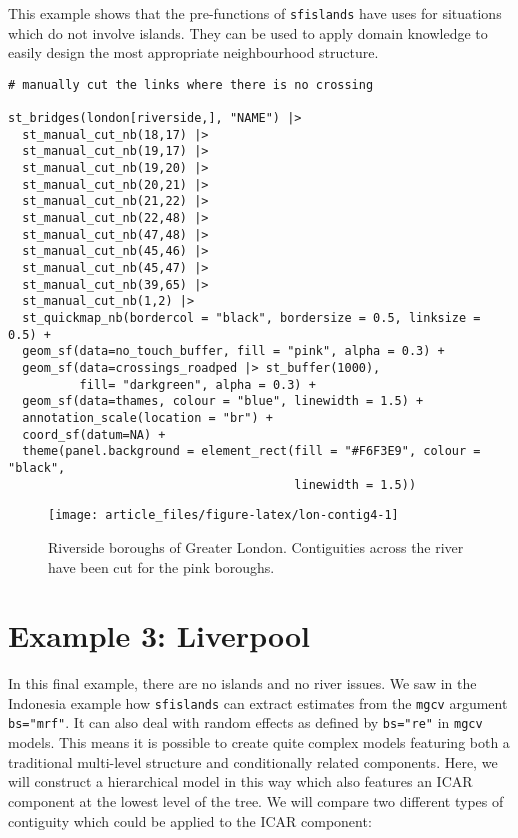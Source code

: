 This example shows that the pre-functions of \texttt{sfislands} have uses for situations which do not involve islands. They can be used to apply domain knowledge to easily design the most appropriate neighbourhood structure.

\begin{verbatim}
# manually cut the links where there is no crossing

st_bridges(london[riverside,], "NAME") |> 
  st_manual_cut_nb(18,17) |> 
  st_manual_cut_nb(19,17) |> 
  st_manual_cut_nb(19,20) |> 
  st_manual_cut_nb(20,21) |> 
  st_manual_cut_nb(21,22) |> 
  st_manual_cut_nb(22,48) |> 
  st_manual_cut_nb(47,48) |> 
  st_manual_cut_nb(45,46) |> 
  st_manual_cut_nb(45,47) |>  
  st_manual_cut_nb(39,65) |> 
  st_manual_cut_nb(1,2) |> 
  st_quickmap_nb(bordercol = "black", bordersize = 0.5, linksize = 0.5) +
  geom_sf(data=no_touch_buffer, fill = "pink", alpha = 0.3) + 
  geom_sf(data=crossings_roadped |> st_buffer(1000), 
          fill= "darkgreen", alpha = 0.3) +
  geom_sf(data=thames, colour = "blue", linewidth = 1.5) +
  annotation_scale(location = "br") +
  coord_sf(datum=NA) + 
  theme(panel.background = element_rect(fill = "#F6F3E9", colour = "black", 
                                        linewidth = 1.5))
\end{verbatim}

\begin{figure}

{\centering \texttt{[image: article\_files/figure-latex/lon-contig4-1]} 

}

\caption{Riverside boroughs of Greater London. Contiguities across the river have been cut for the pink boroughs. }\label{fig:lon-contig4}
\end{figure}

\hypertarget{example-3-liverpool}{%
\section{Example 3: Liverpool}\label{example-3-liverpool}}

In this final example, there are no islands and no river issues. We saw in the Indonesia example how \texttt{sfislands} can extract estimates from the \texttt{mgcv} argument \texttt{bs="mrf"}. It can also deal with random effects as defined by \texttt{bs="re"} in \texttt{mgcv} models. This means it is possible to create quite complex models featuring both a traditional multi-level structure and conditionally related components. Here, we will construct a hierarchical model in this way which also features an ICAR component at the lowest level of the tree. We will compare two different types of contiguity which could be applied to the ICAR component:

